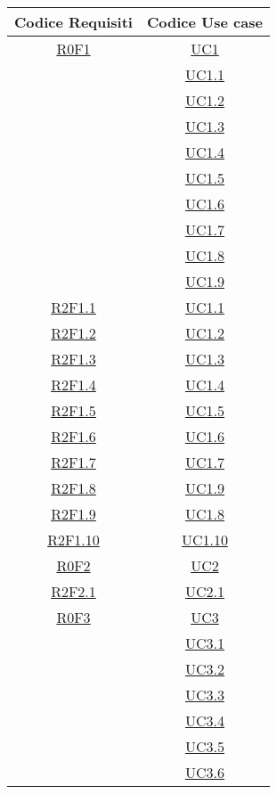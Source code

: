 \normalsize
\begin{longtable}{|c|c|}
\hline
\textbf{Codice Requisiti} & \textbf{Codice Use case} \\
\hline
\endhead
\hyperlink{R0F1}{R0F1} & \hyperlink{UC1}{UC1}\\
& \hyperlink{UC1.1}{UC1.1}\\
& \hyperlink{UC1.2}{UC1.2}\\
& \hyperlink{UC1.3}{UC1.3}\\
& \hyperlink{UC1.4}{UC1.4}\\
& \hyperlink{UC1.5}{UC1.5}\\
& \hyperlink{UC1.6}{UC1.6}\\
& \hyperlink{UC1.7}{UC1.7}\\
& \hyperlink{UC1.8}{UC1.8}\\
& \hyperlink{UC1.9}{UC1.9}\\
\hline
\hyperlink{R2F1.1}{R2F1.1} & \hyperlink{UC1.1}{UC1.1}\\
\hline
\hyperlink{R2F1.2}{R2F1.2} & \hyperlink{UC1.2}{UC1.2}\\
\hline
\hyperlink{R2F1.3}{R2F1.3} & \hyperlink{UC1.3}{UC1.3}\\
\hline
\hyperlink{R2F1.4}{R2F1.4} & \hyperlink{UC1.4}{UC1.4}\\
\hline
\hyperlink{R2F1.5}{R2F1.5} & \hyperlink{UC1.5}{UC1.5}\\
\hline
\hyperlink{R2F1.6}{R2F1.6} & \hyperlink{UC1.6}{UC1.6}\\
\hline
\hyperlink{R2F1.7}{R2F1.7} & \hyperlink{UC1.7}{UC1.7}\\
\hline
\hyperlink{R2F1.8}{R2F1.8} & \hyperlink{UC1.9}{UC1.9}\\
\hline
\hyperlink{R2F1.9}{R2F1.9} & \hyperlink{UC1.8}{UC1.8}\\
\hline
\hyperlink{R2F1.10}{R2F1.10} & \hyperlink{UC1.10}{UC1.10}\\
\hline
\hyperlink{R0F2}{R0F2} & \hyperlink{UC2}{UC2}\\
\hline
\hyperlink{R2F2.1}{R2F2.1} & \hyperlink{UC2.1}{UC2.1}\\
\hline
\hyperlink{R0F3}{R0F3} & \hyperlink{UC3}{UC3}\\
& \hyperlink{UC3.1}{UC3.1}\\
& \hyperlink{UC3.2}{UC3.2}\\
& \hyperlink{UC3.3}{UC3.3}\\
& \hyperlink{UC3.4}{UC3.4}\\
& \hyperlink{UC3.5}{UC3.5}\\
& \hyperlink{UC3.6}{UC3.6}\\

\end{longtable}
